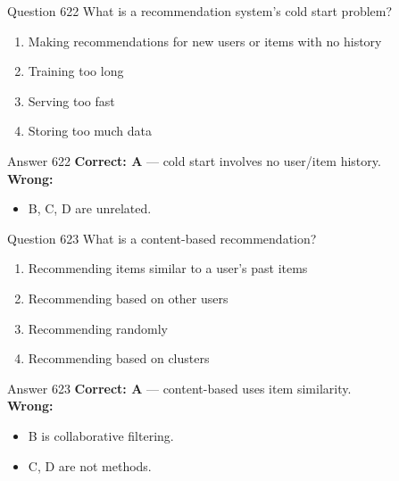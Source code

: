 \documentclass[aspectratio=169,11pt]{beamer}
\begin{document}
	\begin{frame}{Question 622}
		What is a recommendation system's cold start problem?
		\begin{enumerate}[label=\Alph*.]
			\item Making recommendations for new users or items with no history
			\item Training too long
			\item Serving too fast
			\item Storing too much data
		\end{enumerate}
	\end{frame}
	\begin{frame}{Answer 622}
		\textbf{Correct: A} --- cold start involves no user/item history.\\
		\vspace{0.5em}
		\textbf{Wrong:}
		\begin{itemize}
			\item B, C, D are unrelated.
		\end{itemize}
	\end{frame}
	
	\begin{frame}{Question 623}
		What is a content-based recommendation?
		\begin{enumerate}[label=\Alph*.]
			\item Recommending items similar to a user's past items
			\item Recommending based on other users
			\item Recommending randomly
			\item Recommending based on clusters
		\end{enumerate}
	\end{frame}
	\begin{frame}{Answer 623}
		\textbf{Correct: A} --- content-based uses item similarity.\\
		\vspace{0.5em}
		\textbf{Wrong:}
		\begin{itemize}
			\item B is collaborative filtering.
			\item C, D are not methods.
		\end{itemize}
	\end{frame}
	
\end{document}
